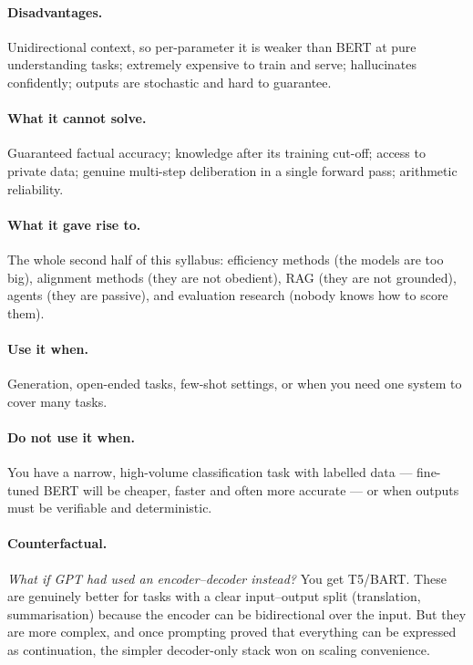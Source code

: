 \documentclass[11pt,a4paper]{article}
\begin{document}
\paragraph{Disadvantages.} Unidirectional context, so per-parameter it is weaker than BERT at
pure understanding tasks; extremely expensive to train and serve; hallucinates confidently;
outputs are stochastic and hard to guarantee.

\paragraph{What it cannot solve.} Guaranteed factual accuracy; knowledge after its training
cut-off; access to private data; genuine multi-step deliberation in a single forward pass;
arithmetic reliability.

\paragraph{What it gave rise to.} The whole second half of this syllabus: efficiency methods
(the models are too big), alignment methods (they are not obedient), RAG (they are not
grounded), agents (they are passive), and evaluation research (nobody knows how to score
them).

\paragraph{Use it when.} Generation, open-ended tasks, few-shot settings, or when you need one
system to cover many tasks.

\paragraph{Do not use it when.} You have a narrow, high-volume classification task with
labelled data --- fine-tuned BERT will be cheaper, faster and often more accurate --- or when
outputs must be verifiable and deterministic.

\paragraph{Counterfactual.} \emph{What if GPT had used an encoder--decoder instead?} You get
T5/BART. These are genuinely better for tasks with a clear input--output split (translation,
summarisation) because the encoder can be bidirectional over the input. But they are more
complex, and once prompting proved that everything can be expressed as continuation, the
simpler decoder-only stack won on scaling convenience.
\end{document}

